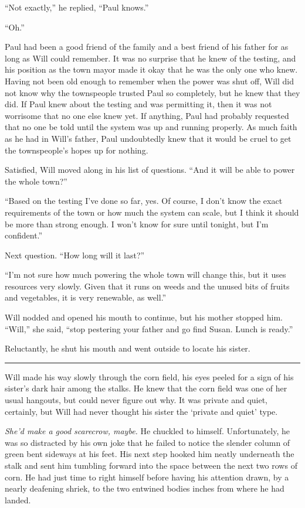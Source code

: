 \documentclass[12pt,letterpaper,oneside,english]{book}
\begin{document}
``Not exactly,'' he replied, ``Paul knows.''

``Oh.''

Paul had been a good friend of the family and a best friend of his
father for as long as Will could remember. It was no surprise that he
knew of the testing, and his position as the town mayor made it okay
that he was the only one who knew. Having not been old enough to
remember when the power was shut off, Will did not know why the
townspeople trusted Paul so completely, but he knew that they did. If
Paul knew about the testing and was permitting it, then it was not
worrisome that no one else knew yet. If anything, Paul had probably
requested that no one be told until the system was up and running
properly. As much faith as he had in Will's father, Paul undoubtedly
knew that it would be cruel to get the townspeople's hopes up for
nothing.

Satisfied, Will moved along in his list of questions. ``And it will be
able to power the whole town?''

``Based on the testing I've done so far, yes. Of course, I don't know
the exact requirements of the town or how much the system can scale, but
I think it should be more than strong enough. I won't know for sure
until tonight, but I'm confident.''

Next question. ``How long will it last?''

``I'm not sure how much powering the whole town will change this, but it
uses resources very slowly. Given that it runs on weeds and the unused
bits of fruits and vegetables, it is very renewable, as well.''

Will nodded and opened his mouth to continue, but his mother stopped
him. ``Will,'' she said, ``stop pestering your father and go find
Susan. Lunch is ready.''

Reluctantly, he shut his mouth and went outside to locate his sister.

\medskip
{\centering\rule{\linewidth}{1pt}}
\smallskip

Will made his way slowly through the corn field, his eyes peeled for a
sign of his sister's dark hair among the stalks. He knew that the corn
field was one of her usual hangouts, but could never figure out why. It
was private and quiet, certainly, but Will had never thought his sister
the `private and quiet' type.

\textit{She'd make a good scarecrow, maybe.} He chuckled to himself.
Unfortunately, he was so distracted by his own joke that he failed to
notice the slender column of green bent sideways at his feet. His next
step hooked him neatly underneath the stalk and sent him tumbling forward
into the space between the next two rows of corn. He had just time to
right himself before having his attention drawn, by a nearly deafening
shriek, to the two entwined bodies inches from where he had landed.
\end{document}
